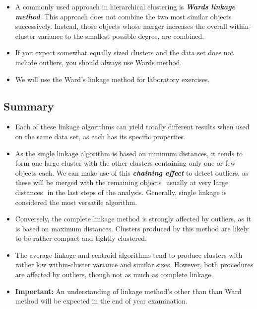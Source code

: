 \documentclass[a4paper,12pt]{article}
\begin{document}
\begin{itemize}

\item A commonly used approach in hierarchical clustering is \textbf{\textit{Wards linkage method}}.
This approach does not combine the two most similar objects successively. Instead,
those objects whose merger increases the overall within-cluster variance to the
smallest possible degree, are combined. 
\item If you expect somewhat equally sized
clusters and the data set does not include outliers, you should always use Wards
method.

\item We will use the Ward's linkage method for laboratory exercises.
\end{itemize}
\newpage
\subsection{Summary}
\begin{itemize}


\item Each of these linkage algorithms can yield totally different results when used on the same data set, as each has its specific properties. 
\item As the single linkage algorithm is based on minimum distances, it tends to form one large cluster with the other clusters containing only one or few objects each. We can make use of this \textbf{\textit{chaining effect}} to detect outliers, as these will be merged with the remaining objects  usually at very large distances  in the last steps of the analysis. Generally, single linkage is considered the most versatile algorithm.
\item 
Conversely, the complete linkage method is strongly affected by outliers, as it is based on maximum distances. Clusters produced by this method are likely to be rather compact and tightly clustered.
\item  The average linkage and centroid algorithms tend to produce clusters with rather low within-cluster variance and similar sizes. However, both procedures are affected by outliers, though not as much as complete linkage.

\item \textbf{Important:} An understanding of linkage method's other than than Ward method will be expected in the end of year examination.
\end{itemize}
\end{document}
